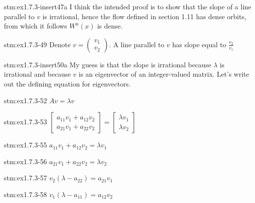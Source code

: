 \begin{explanation}{stm:ex1.7.3-insert47a}
I think the intended proof is to show that the slope of a line parallel to $v$ is irrational, hence the flow defined in section 1.11 has dense orbits, from which it follows $W^u(x)$ is dense.
\end{explanation}

\begin{statement}{stm:ex1.7.3-49}
Denote $v = \begin{pmatrix} v_1 \\ v_2 \end{pmatrix}$. A line parallel to $v$ has slope equal to $\frac{v_2}{v_1}$
\end{statement}

\begin{explanation}{stm:ex1.7.3-insert50a}
My guess is that the slope is irrational because $\lambda$ is irrational and because $v$ is an eigenvector of an integer-valued matrix. Let's write out the defining equation for eigenvectors.
\end{explanation}

\begin{statement}{stm:ex1.7.3-52}
$A v = \lambda v$
\end{statement}

\begin{statement}{stm:ex1.7.3-53}
$\begin{bmatrix} a_{11}v_1 + a_{12}v_2 \\ a_{21}v_1 + a_{22}v_2 \end{bmatrix} = \begin{bmatrix} \lambda v_1 \\ \lambda v_2 \end{bmatrix}$
\end{statement}

\begin{statement}{stm:ex1.7.3-55}
$a_{11}v_1 + a_{12}v_2 = \lambda v_1$
\end{statement}

\begin{statement}{stm:ex1.7.3-56}
$a_{21}v_1 + a_{22}v_2 = \lambda v_2$
\end{statement}

\begin{statement}{stm:ex1.7.3-57}
$v_2(\lambda - a_{22}) = a_{21}v_1$
\end{statement}

\begin{statement}{stm:ex1.7.3-58}
$v_1(\lambda - a_{11}) = a_{12}v_2$
\end{statement}

